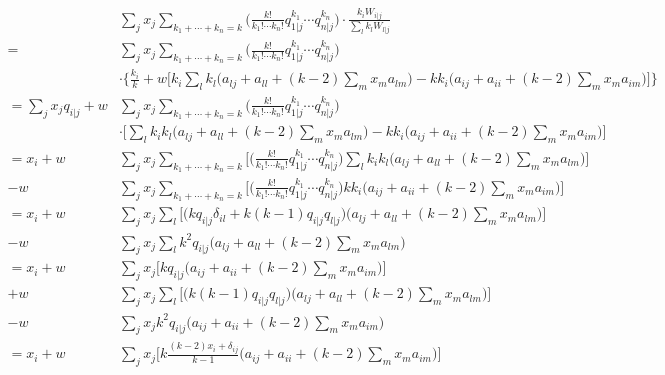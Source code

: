 \documentclass[14pt, a4paper, justified]{article}
\begin{document}
\begin{equation}
    \begin{split}
        & \sum_j x_j \sum_{k_1 + \cdots + k_n = k} \Big( \frac{k!}{k_1! \cdots k_n!} q_{1|j}^{k_1} \cdots q_{n|j}^{k_n} \Big) \cdot \frac{k_i W_{i|j}}{\sum_l k_l W_{l|j}}
        \\
        = & \sum_j x_j \sum_{k_1 + \cdots + k_n = k} \Big( \frac{k!}{k_1! \cdots k_n!} q_{1|j}^{k_1}
        \cdots q_{n|j}^{k_n} \Big)
        \\
        & \cdot \Big\{ \frac{k_i}{k} + w \Big[ k_i \sum_l k_l \Big( a_{lj} + a_{ll} + (k-2) \sum_m x_m a_{lm} \Big) - k k_i \Big( a_{ij} + a_{ii} + (k-2) \sum_m x_m a_{im} \Big) \Big] \Big\}
        \\
        = \sum_j x_j q_{i|j} + w & \sum_j x_j \sum_{k_1 + \cdots + k_n = k} \Big( \frac{k!}{k_1! \cdots k_n!} q_{1|j}^{k_1}
        \cdots q_{n|j}^{k_n} \Big)
        \\
        & \cdot \Big[ \sum_l k_i k_l \Big(a_{lj} + a_{ll} + (k-2) \sum_m x_m a_{lm} \Big) - k k_i \Big( a_{ij} + a_{ii} + (k-2) \sum_m x_m a_{im} \Big) \Big]
        \\
        = x_i + w & \sum_j x_j \sum_{k_1 + \cdots + k_n = k} \Big[ \Big( \frac{k!}{k_1! \cdots k_n!} q_{1|j}^{k_1}
        \cdots q_{n|j}^{k_n} \Big) \sum_l k_i k_l \Big(a_{lj} + a_{ll} + (k-2) \sum_m x_m a_{lm} \Big) \Big]
        \\
        - w & \sum_j x_j \sum_{k_1 + \cdots + k_n = k} \Big[ \Big( \frac{k!}{k_1! \cdots k_n!} q_{1|j}^{k_1} \cdots q_{n|j}^{k_n} \Big) k k_i \Big( a_{ij} + a_{ii} + (k-2) \sum_m x_m a_{im} \Big) \Big]
        \\
        = x_i + w & \sum_j x_j \sum_l \Big[ \Big( k q_{i|j} \delta_{il} + k(k-1) q_{i|j}q_{l|j} \Big) \Big( a_{lj} + a_{ll} + (k-2) \sum_m x_m a_{lm} \Big) \Big]
        \\
        - w & \sum_j x_j \sum_l k^2 q_{i|j} \Big( a_{lj} + a_{ll}+ (k-2) \sum_m x_m a_{lm} \Big)
        \\
        = x_i + w & \sum_j x_j \Big[ k q_{i|j} \Big( a_{ij} + a_{ii} + (k-2) \sum_m x_m a_{im} \Big) \Big]
        \\
        + w & \sum_j x_j \sum_l \Big[ \Big(k(k-1) q_{i|j}q_{l|j} \Big) \Big( a_{lj} + a_{ll} + (k-2) \sum_m x_m a_{lm} \Big) \Big]
        \\
        - w & \sum_j x_j k^2 q_{i|j} \Big( a_{ij} + a_{ii}+ (k-2) \sum_m x_m a_{im} \Big)
        \\
        = x_i + w & \sum_j x_j \Big[ k \frac{(k-2)x_i + \delta_{ij}}{k-1} \Big( a_{ij} + a_{ii} + (k-2) \sum_m x_m a_{im} \Big) \Big]

\end{split}
\end{equation}
\end{document}
